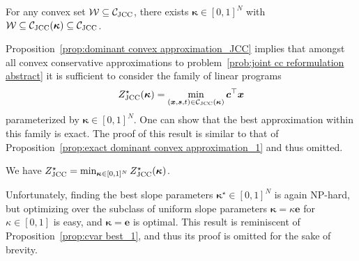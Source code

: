 \documentclass[nonblindrev]{informs2017}
\newcommand{\1}[1]{\mathds{1}{\left(#1\right)}}
\begin{document}
\begin{proposition}\label{prop:dominant convex approximation_JCC}
For any convex set $\mathcal{W} \subseteq \mathcal{C}_{\rm JCC}$, there exists $\bm{\kappa} \in[0,1]^N$ with $\mathcal{W} \subseteq \mathcal{C}_{\rm JCC} (\bm{\kappa}) \subseteq \mathcal{C}_{\rm JCC}$.
\end{proposition}


Proposition~\ref{prop:dominant convex approximation_JCC} implies that amongst all convex conservative approximations to problem~\eqref{prob:joint cc reformulation abstract} it is sufficient to consider the family of linear programs 
\begin{equation}
\label{prob:linear approximation joint cc_1}
Z^\star_{\rm JCC}(\bm{\kappa}) =\min_{(\bm{x},\bm{s}, t)\in \mathcal{C}_{\rm JCC}(\bm \kappa)} \bm c^\top \bm x
\end{equation}
parameterized by $\bm{\kappa} \in [0,1]^N$. One can show that the best approximation within this family is exact. The proof of this result is similar to that of Proposition~\ref{prop:exact dominant convex approximation_1} and thus omitted.
\begin{proposition}\label{prop:exact dominant convex approximation_2}
We have $Z^\star_{\rm JCC} = \min_{\bm\kappa \in [0,1]^N} Z^\star_{\rm JCC}(\bm{\kappa})$.
\end{proposition}

Unfortunately, finding the best slope parameters $\bm \kappa^\star\in [0,1]^N$ is again NP-hard, but optimizing over the subclass of uniform slope parameters $\bm{\kappa} = \kappa \bm{e}$ for  $\kappa \in [0,1]$ is easy, and $\bm{\kappa} = \bm{e}$ is optimal. This result is reminiscent of Proposition~\ref{prop:cvar best_1}, and thus its proof is omitted for the sake of brevity.
\end{document}
